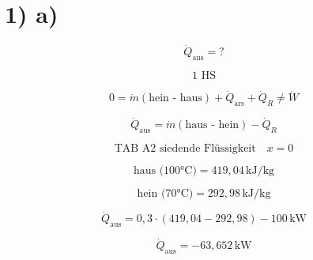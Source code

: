 \section*{1) a)}

\[
\dot{Q}_{\text{aus}} = ?
\]

\[
1 \text{ HS}
\]

\[
0 = \dot{m} (\text{hein - haus}) + \dot{Q}_{\text{ars}} + \dot{Q}_R \neq \dot{W}
\]

\[
\dot{Q}_{\text{aus}} = \dot{m} (\text{haus - hein}) - \dot{Q}_R
\]

\[
\text{TAB A2 siedende Flüssigkeit} \quad x = 0
\]

\[
\text{haus (100°C)} = 419{,}04 \, \text{kJ/kg}
\]

\[
\text{hein (70°C)} = 292{,}98 \, \text{kJ/kg}
\]

\[
\dot{Q}_{\text{aus}} = 0{,}3 \cdot (419{,}04 - 292{,}98) - 100 \, \text{kW}
\]

\[
\dot{Q}_{\text{aus}} = -63{,}652 \, \text{kW}
\]